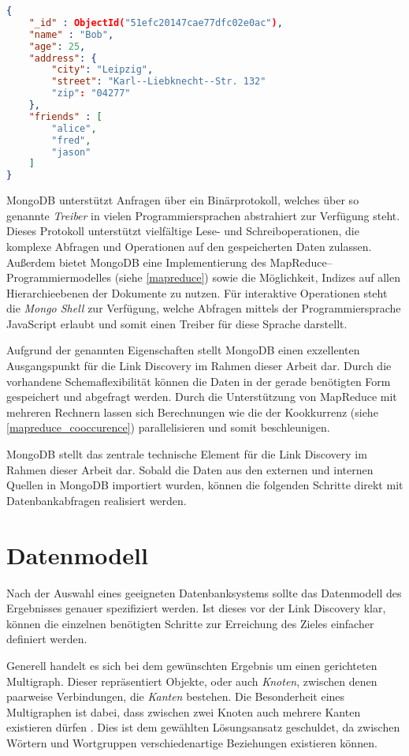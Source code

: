 \begin{lstlisting}[language=json, label={lst:json}, caption={Ein Beispiel für ein Dokument in MongoDB}]
{
    "_id" : ObjectId("51efc20147cae77dfc02e0ac"),
    "name" : "Bob",
    "age": 25,
    "address": {
        "city": "Leipzig",
        "street": "Karl--Liebknecht--Str. 132"
        "zip": "04277"
    },
    "friends" : [
        "alice",
        "fred",
        "jason"
    ]
}
\end{lstlisting}

MongoDB unterstützt Anfragen über ein Binärprotokoll, welches über so genannte \emph{Treiber} in vielen Programmiersprachen abstrahiert zur Verfügung steht. Dieses Protokoll unterstützt vielfältige Lese- und Schreiboperationen, die komplexe Abfragen und Operationen auf den gespeicherten Daten zulassen. Außerdem bietet MongoDB eine Implementierung des MapReduce--Programmiermodelles (siehe \ref{mapreduce}) sowie die Möglichkeit, Indizes auf allen Hierarchieebenen der Dokumente zu nutzen. Für interaktive Operationen steht die \emph{Mongo Shell} zur Verfügung, welche Abfragen mittels der Programmiersprache JavaScript erlaubt und somit einen Treiber für diese Sprache darstellt.

Aufgrund der genannten Eigenschaften stellt MongoDB einen exzellenten Ausgangspunkt für die Link Discovery im Rahmen dieser Arbeit dar. Durch die vorhandene Schemaflexibilität können die Daten in der gerade benötigten Form gespeichert und abgefragt werden. Durch die Unterstützung von MapReduce mit mehreren Rechnern lassen sich Berechnungen wie die der Kookkurrenz (siehe \ref{mapreduce_cooccurence}) parallelisieren und somit beschleunigen.

MongoDB stellt das zentrale technische Element für die Link Discovery im Rahmen dieser Arbeit dar. Sobald die Daten aus den externen und internen Quellen in MongoDB importiert wurden, können die folgenden Schritte direkt mit Datenbankabfragen realisiert werden.

\section{Datenmodell}

Nach der Auswahl eines geeigneten Datenbanksystems sollte das Datenmodell des Ergebnisses genauer spezifiziert werden. Ist dieses vor der Link Discovery klar, können die einzelnen benötigten Schritte zur Erreichung des Zieles einfacher definiert werden.

Generell handelt es sich bei dem gewünschten Ergebnis um einen gerichteten Multigraph. Dieser repräsentiert Objekte, oder auch \emph{Knoten}, zwischen denen paarweise Verbindungen, die \emph{Kanten} bestehen. Die Besonderheit eines Multigraphen ist dabei, dass zwischen zwei Knoten auch mehrere Kanten existieren dürfen \cite{rd2012}. Dies ist dem gewählten Lösungsansatz geschuldet, da zwischen Wörtern und Wortgruppen verschiedenartige Beziehungen existieren können.

